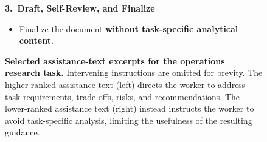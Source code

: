 \begin{figure}[H]
\begin{minipage}[t]{0.485\textwidth}
\begin{tcolorbox}
\textbf{3.\ Draft, Self-Review, and Finalize}
\begin{itemize}
    \setlength{\itemsep}{3pt}
    \setlength{\parskip}{0pt}
    \item Finalize the document \textbf{without task-specific analytical
    content}.
\end{itemize}
\end{tcolorbox}
\end{minipage}

\caption{\textbf{Selected assistance-text excerpts for the operations research
task.} Intervening instructions are omitted for brevity. The higher-ranked
assistance text (left) directs the worker to address task requirements,
trade-offs, risks, and recommendations. The lower-ranked assistance text
(right) instead instructs the worker to avoid task-specific analysis, limiting
the usefulness of the resulting guidance.}
\label{fig:assistance-text-comparison}
\end{figure}